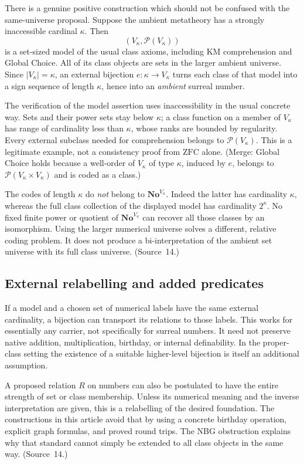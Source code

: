 \documentclass[11pt,letterpaper]{article}
\theoremstyle{definition}
\theoremstyle{remark}
\newcommand{\No}{\mathbf{No}}
\newcommand{\Pow}{\mathcal P}
\newcommand{\card}[1]{\lvert#1\rvert}
\newcommand{\ZFC}{\mathrm{ZFC}}
\begin{document}
There is a genuine positive construction which should not be confused with the
same-universe proposal. Suppose the ambient metatheory has a strongly inaccessible
cardinal $\kappa$. Then
\[
 (V_\kappa,\Pow(V_\kappa))
\]
is a set-sized model of the usual class axioms, including KM comprehension and
Global Choice. All of its class objects are sets in the larger ambient universe.
Since $\card{V_\kappa}=\kappa$, an external bijection $e:\kappa\to V_\kappa$ turns
each class of that model into a sign sequence of length $\kappa$, hence into an
\emph{ambient} surreal number.

The verification of the model assertion uses inaccessibility in the usual concrete
way. Sets and their power sets stay below $\kappa$; a class function on a member of
$V_\kappa$ has range of cardinality less than $\kappa$, whose ranks are bounded by
regularity. Every external subclass needed for comprehension belongs to
$\Pow(V_\kappa)$. This is a legitimate example, not a consistency proof from $\ZFC$
alone. (Merge: Global Choice holds because a well-order of $V_\kappa$ of type $\kappa$,
induced by $e$, belongs to $\Pow(V_\kappa\times V_\kappa)$ and is coded as a class.)

The codes of length $\kappa$ do \emph{not} belong to $\No^{V_\kappa}$. Indeed the
latter has cardinality $\kappa$, whereas the full class collection of the displayed
model has cardinality $2^\kappa$. No fixed finite power or quotient of
$\No^{V_\kappa}$ can recover all those classes by an isomorphism. Using the larger
numerical universe solves a different, relative coding problem. It does not produce
a bi-interpretation of the ambient set universe with its full class universe.
(Source~14.)

\subsection{External relabelling and added predicates}

If a model and a chosen set of numerical labels have the same external cardinality,
a bijection can transport its relations to those labels. This works for essentially
any carrier, not specifically for surreal numbers. It need not preserve native
addition, multiplication, birthday, or internal definability. In the proper-class
setting the existence of a suitable higher-level bijection is itself an additional
assumption.

A proposed relation $R$ on numbers can also be postulated to have the entire
strength of set or class membership. Unless its numerical meaning and the inverse
interpretation are given, this is a relabelling of the desired foundation. The
constructions in this article avoid that by using a concrete birthday operation,
explicit graph formulas, and proved round trips. The NBG obstruction explains why
that standard cannot simply be extended to all class objects in the same way.
(Source~14.)
\end{document}
